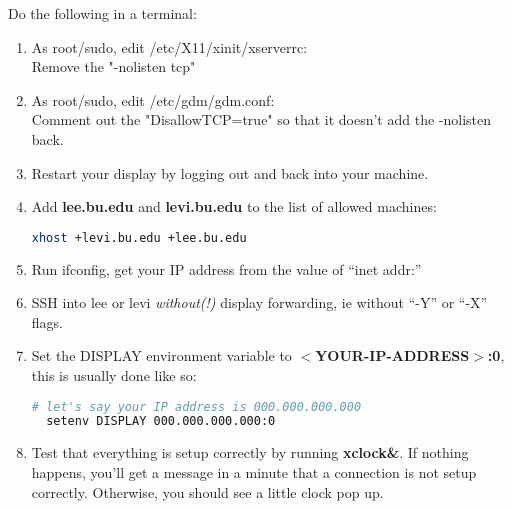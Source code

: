 \noindent Do the following in a terminal: 
\begin{enumerate}
\item As root/sudo, edit /etc/X11/xinit/xserverrc:\\
  Remove the "-nolisten tcp"
\item As root/sudo, edit /etc/gdm/gdm.conf:\\
  Comment out the "DisallowTCP=true" so that it doesn't add the
  -nolisten back.  
\item Restart your display by logging out and back into your machine.
\item Add \textbf{lee.bu.edu} and \textbf{levi.bu.edu} to the list of
  allowed machines: 
\begin{lstlisting}[language=Bash]
  xhost +levi.bu.edu +lee.bu.edu
\end{lstlisting}
\item Run ifconfig, get your IP address from the value of ``inet addr:''
\item SSH into lee or levi \emph{without(!)} display forwarding, ie
  without ``-Y'' or ``-X'' flags.  
\item Set the DISPLAY environment variable to
  \textbf{$<$YOUR-IP-ADDRESS$>$:0}, this is usually done like so:

\begin{lstlisting}[language=Bash]
  # let's say your IP address is 000.000.000.000
  setenv DISPLAY 000.000.000.000:0
\end{lstlisting}
\item Test that everything is setup correctly by running
  \textbf{xclock\&}. If nothing happens,  
  you'll get a message in a minute that a connection is not setup correctly.
  Otherwise, you should see a little clock pop up. 
\end{enumerate}

